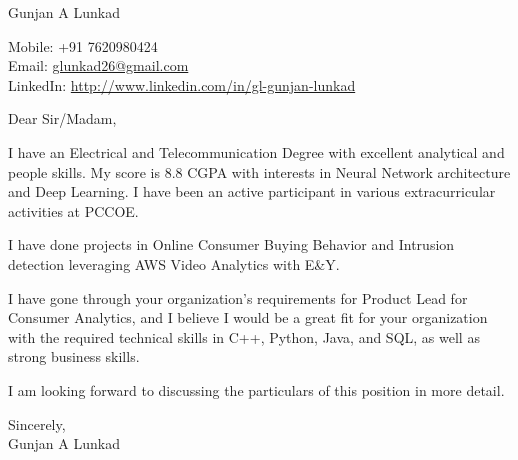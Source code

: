 \documentclass[a4paper,12pt]{letter}
\begin{document}
\begin{letter}{}

    \begin{center}
        Gunjan A Lunkad
    \end{center}

    \begin{flushright}
        Mobile: +91 7620980424 \\
        Email: \href{mailto:glunkad26@gmail.com}{glunkad26@gmail.com} \\
        LinkedIn: \href{http://www.linkedin.com/in/gl-gunjan-lunkad}{http://www.linkedin.com/in/gl-gunjan-lunkad}
    \end{flushright}

    \opening{Dear Sir/Madam,}

    I have an Electrical and Telecommunication Degree with excellent analytical and people skills. My score is 8.8 CGPA with interests in Neural Network architecture and Deep Learning. I have been an active participant in various extracurricular activities at PCCOE.

    I have done projects in Online Consumer Buying Behavior and Intrusion detection leveraging AWS Video Analytics with E\&Y.

    I have gone through your organization's requirements for Product Lead for Consumer Analytics, and I believe I would be a great fit for your organization with the required technical skills in C++, Python, Java, and SQL, as well as strong business skills.

    I am looking forward to discussing the particulars of this position in more detail.

    \closing{Sincerely, \\ Gunjan A Lunkad }
    \vspace{2cm}  %


\end{letter}
\end{document}
